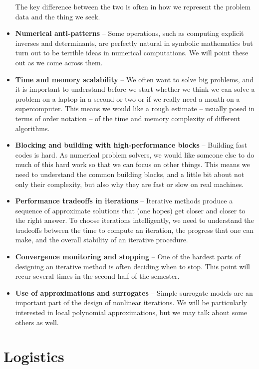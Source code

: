 \documentclass[12pt, leqno]{article}
\begin{document}
\begin{itemize}
  The key difference between the two is often in how we represent the
  problem data and the thing we seek.
\item {\bf Numerical anti-patterns} -- Some operations, such as
  computing explicit inverses and determinants, are perfectly natural
  in symbolic mathematics but turn out to be terrible ideas in
  numerical computations.  We will point these out as we come across
  them.
\item {\bf Time and memory scalability} -- We often want to solve
  big problems, and it is important to understand before we start
  whether we think we can solve a problem on a laptop in a second or
  two or if we really need a month on a supercomputer.  This means
  we would like a rough estimate -- usually posed in terms of order notation
  -- of the time and memory complexity of different algorithms.
\item {\bf Blocking and building with high-performance blocks} --
  Building fast codes is hard.  As numerical problem solvers, we would
  like someone else to do much of this hard work so that we can focus
  on other things.  This means we need to understand the common
  building blocks, and a little bit about not only their complexity,
  but also why they are fast or slow on real machines.
\item {\bf Performance tradeoffs in iterations} -- Iterative methods
  produce a sequence of approximate solutions that (one hopes) get
  closer and closer to the right answer.  To choose iterations
  intelligently, we need to understand the tradeoffs between the
  time to compute an iteration, the progress that one can make, and
  the overall stability of an iterative procedure.
\item {\bf Convergence monitoring and stopping} -- One of the hardest
  parts of designing an iterative method is often deciding when to
  stop.  This point will recur several times in the second half of the
  semester.
\item {\bf Use of approximations and surrogates} -- Simple surrogate
  models are an important part of the design of nonlinear iterations.
  We will be particularly interested in local polynomial
  approximations, but we may talk about some others as well.
\end{itemize}

\section{Logistics}
\end{document}

